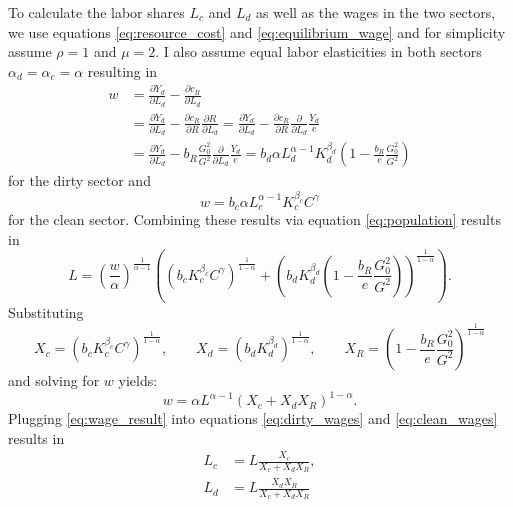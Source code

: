 To calculate the labor shares $L_c$ and $L_d$ as well as the wages in the two sectors, we use equations \eqref{eq:resource_cost} and \eqref{eq:equilibrium_wage} and for simplicity assume $\rho=1$ and $\mu=2$. I also assume equal labor elasticities in both sectors $\alpha_d = \alpha_c = \alpha$ resulting in
\begin{align}
	w &= \frac{\partial Y_d}{\partial L_d} - \frac{\partial c_R}{\partial L_d} \nonumber \\
	&= \frac{\partial Y_d}{\partial L_d} - \frac{\partial c_R}{\partial R} \frac{\partial R}{\partial L_d} \nonumber = \frac{\partial Y_d}{\partial L_d} - \frac{\partial c_R}{\partial R} \frac{\partial}{\partial L_d} \frac{Y_d}{e} \nonumber \\
	&= \frac{\partial Y_d}{\partial L_d} - b_R\frac{G_0^2}{G^2} \frac{\partial}{\partial L_d} \frac{Y_d}{e} = b_d \alpha L_d^{\alpha-1} K_d^{\beta_d}\left( 1-\frac{b_R}{e}\frac{G_0^2}{G^2} \right)
	\label{eq:dirty_wages}
\end{align}
for the dirty sector and
\begin{equation}
	w = b_c \alpha L_c^{\alpha-1} K_c^{\beta_c} C^{\gamma}
	\label{eq:clean_wages}
\end{equation}
for the clean sector. Combining these results via equation \eqref{eq:population} results in
\begin{equation}
	L = \left( \frac{w}{\alpha} \right)^{\frac{1}{\alpha-1}}\left( \left( b_c K_c^{\beta_c}C^{\gamma} \right)^{\frac{1}{1-\alpha}} + \left( b_d K_d^{\beta_d} \left( 1 - \frac{b_R}{e}\frac{G_0^2}{G^2} \right) \right)^{\frac{1}{1-\alpha}} \right).
\end{equation}
Substituting 
\begin{equation}
	X_c = (b_c K_c^{\beta_c}C^{\gamma})^{\frac{1}{1-\alpha}}, \qquad X_d = (b_d K_d^{\beta_d})^{\frac{1}{1-\alpha}}, \qquad X_R = \left( 1 - \frac{b_R}{e}\frac{G_0^2}{G^2} \right)^{\frac{1}{1-\alpha}}
	\label{eq:substitutions}
\end{equation}
and solving for $w$ yields:
\begin{equation}
	w = \alpha L^{\alpha-1}\left( X_c + X_d X_R \right)^{1-\alpha}.
	\label{eq:wage_result}
\end{equation}
Plugging \eqref{eq:wage_result} into equations \eqref{eq:dirty_wages} and \eqref{eq:clean_wages} results in 
\begin{align}
	L_c &= L \frac{X_c}{X_c + X_d X_R}, \label{eq:clean_labor} \\
	L_d &= L \frac{X_d X_R}{X_c + X_d X_R} \label{eq:dirty_labor}
\end{align}
